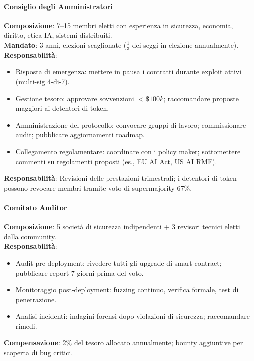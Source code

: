\documentclass[11pt]{article}
\begin{document}
\begin{itemize}[noitemsep]
\paragraph{Consiglio degli Amministratori}
\textbf{Composizione}: 7--15 membri eletti con esperienza in sicurezza, economia, diritto, etica IA, sistemi distribuiti.\\
\textbf{Mandato}: 3 anni, elezioni scaglionate ($\frac{1}{3}$ dei seggi in elezione annualmente).\\
\textbf{Responsabilità}:
\begin{itemize}[noitemsep]
  \item Risposta di emergenza: mettere in pausa i contratti durante exploit attivi (multi-sig 4-di-7).
  \item Gestione tesoro: approvare sovvenzioni $<\$100k$; raccomandare proposte maggiori ai detentori di token.
  \item Amministrazione del protocollo: convocare gruppi di lavoro; commissionare audit; pubblicare aggiornamenti roadmap.
  \item Collegamento regolamentare: coordinare con i policy maker; sottomettere commenti su regolamenti proposti (es., EU AI Act, US AI RMF).
\end{itemize}
\textbf{Responsabilità}: Revisioni delle prestazioni trimestrali; i detentori di token possono revocare membri tramite voto di supermajority 67\%.

\paragraph{Comitato Auditor}
\textbf{Composizione}: 5 società di sicurezza indipendenti + 3 revisori tecnici eletti dalla community.\\
\textbf{Responsabilità}:
\begin{itemize}[noitemsep]
  \item Audit pre-deployment: rivedere tutti gli upgrade di smart contract; pubblicare report 7 giorni prima del voto.
  \item Monitoraggio post-deployment: fuzzing continuo, verifica formale, test di penetrazione.
  \item Analisi incidenti: indagini forensi dopo violazioni di sicurezza; raccomandare rimedi.
\end{itemize}
\textbf{Compensazione}: 2\% del tesoro allocato annualmente; bounty aggiuntive per scoperta di bug critici.


\end{itemize}
\end{document}
